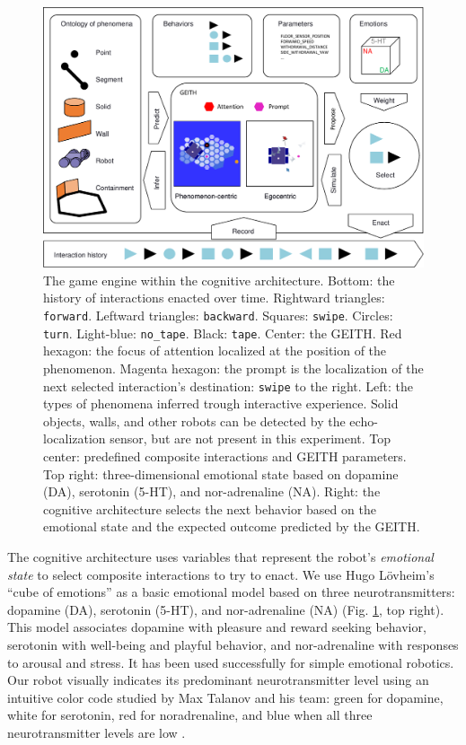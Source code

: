 \documentclass[runningheads]{llncs}
\begin{document}
\begin{figure}
	\includegraphics[width=\textwidth]{Figure_geith.pdf}
	\caption{The game engine within the cognitive architecture.
		Bottom: the history of interactions enacted over time.
		Rightward triangles: \texttt{forward}. Leftward triangles: \texttt{backward}. Squares: \texttt{swipe}. Circles: \texttt{turn}. Light-blue: \texttt{no\_tape}. Black: \texttt{tape}.
		Center: the GEITH.
		Red hexagon: the focus of attention localized at the position of the phenomenon. 
		Magenta hexagon: the prompt is the localization of the next selected interaction's destination: \texttt{swipe} to the right.
		Left: the types of phenomena inferred trough interactive experience.
		Solid objects, walls, and other robots can be detected by the echo-localization sensor, but are not present in this experiment.
		Top center: predefined composite interactions and GEITH parameters.
		Top right: three-dimensional emotional state based on dopamine (DA), serotonin (5-HT), and nor-adrenaline (NA).
		Right: the cognitive architecture selects the next behavior based on the emotional state and the expected outcome predicted by the GEITH.} \label{fig:geith}
\end{figure}

The cognitive architecture uses variables that represent the robot's \textit{emotional state} to select composite interactions to try to enact.
We use Hugo Lövheim's ``cube of emotions'' \cite{lovheim_new_2012} as a basic emotional model based on three neurotransmitters: dopamine (DA), serotonin (5-HT), and nor-adrenaline (NA) (Fig. \ref{fig:geith}, top right).
This model associates dopamine with pleasure and reward seeking behavior, serotonin with well-being and playful behavior, and nor-adrenaline with responses to arousal and stress.
It has been used successfully for simple emotional robotics.
Our robot visually indicates its predominant neurotransmitter level using an intuitive color code studied by Max Talanov and his team: green for dopamine, white for serotonin, red for noradrenaline, and blue when all three neurotransmitter levels are low \cite{chebotareva_emotional_2019}.
\end{document}
